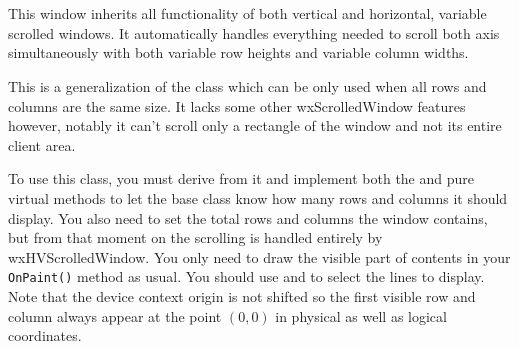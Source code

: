
\section{}\label{wxhvscrolledwindow}

This window inherits all functionality of both vertical and horizontal,
variable scrolled windows. It automatically handles everything needed to
scroll both axis simultaneously with both variable row heights and variable
column widths.

This is a generalization of the 
class which can be only used when all rows and columns are the same size. It
lacks some other wxScrolledWindow features however, notably it can't scroll
only a rectangle of the window and not its entire client area.

To use this class, you must derive from it and implement both the
 and
 pure virtual
methods to let the base class know how many rows and columns it should
display. You also need to set the total rows and columns the window contains,
but from that moment on the scrolling is handled entirely by
wxHVScrolledWindow. You only need to draw the visible part of contents in
your {\tt OnPaint()} method as usual. You should use
and  to select the
lines to display. Note that the device context origin is not shifted so the
first visible row and column always appear at the point $(0, 0)$ in physical
as well as logical coordinates.


\\
\\
\\


